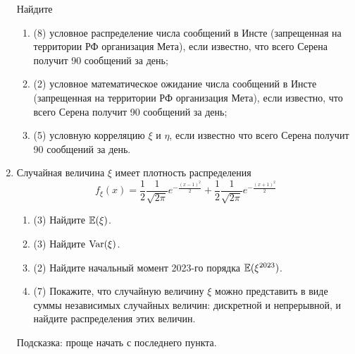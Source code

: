 \begin{enumerate}
    Найдите 
	\begin{enumerate}
	\item (8) условное распределение числа сообщений в Инсте (запрещенная на территории РФ организация Мета), если известно, что всего Серена получит 90 сообщений за день;
	\item (2) условное математическое ожидание числа сообщений в Инсте (запрещенная на территории РФ организация Мета), если известно, что всего Серена получит 90 сообщений за день;
	\item (5) условную корреляцию $\xi$ и $\eta$, если известно что всего Серена получит 90 сообщений за день.
	\end{enumerate}
	
	
	\item Случайная величина $\xi$ имеет плотность распределения 
\[
    f_{\xi}(x)=\frac{1}{2} \frac{1}{\sqrt{2 \pi}} e^{-\frac{(x-1)^2}{2}}+\frac{1}{2} \frac{1}{\sqrt{2 \pi}} e^{-\frac{(x+1)^2}{2}}
\]
	\begin{enumerate}
		\item (3) Найдите  $\operatorname{\mathbb{E}}(\xi)$.
		\item (3) Найдите $\operatorname{Var}(\xi)$.
		\item (2) Найдите  начальный момент 2023-го порядка $\operatorname{\mathbb{E}}(\xi^{2023})$.
		\item (7) Покажите, что случайную величину $\xi$ можно представить в виде суммы независимых случайных величин: дискретной и непрерывной, и найдите распределения этих величин.
	\end{enumerate}
	Подсказка: проще начать с последнего пункта.

\end{enumerate}

